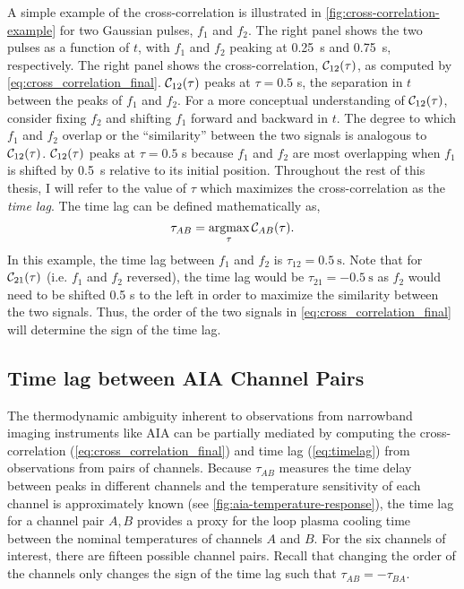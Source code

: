 A simple example of the cross-correlation is illustrated in \autoref{fig:cross-correlation-example} for two Gaussian pulses, $f_1$ and $f_2$. The right panel shows the two pulses as a function of $t$, with $f_1$ and $f_2$ peaking at \SI{0.25}{\second} and \SI{0.75}{\second}, respectively. The right panel shows the cross-correlation, $\crosscor[12]$, as computed by \autoref{eq:cross_correlation_final}. $\crosscor[12]$ peaks at $\tau=0.5$ \si{\second}, the separation in $t$ between the peaks of $f_1$ and $f_2$. For a more conceptual understanding of $\crosscor[12]$, consider fixing $f_2$ and shifting $f_1$ forward and backward in $t$. The degree to which $f_1$ and $f_2$ overlap or the ``similarity'' between the two signals is analogous to $\crosscor[12]$. $\crosscor[12]$ peaks at $\tau=0.5$ \si{\second} because $f_1$ and $f_2$ are most overlapping when $f_1$ is shifted by \SI{0.5}{\second} relative to its initial position. Throughout the rest of this thesis, I will refer to the value of $\tau$ which maximizes the cross-correlation as the \textit{time lag}. The time lag can be defined mathematically as,
\begin{equation}\label{eq:timelag}
    \tau_{AB} = \argmax_{\tau}\crosscor.
\end{equation}
In this example, the time lag between $f_1$ and $f_2$ is $\tau_{12}=\SI{0.5}{\second}$. Note that for $\crosscor[21]$ (i.e. $f_1$ and $f_2$ reversed), the time lag would be $\tau_{21}=\SI{-0.5}{\second}$ as $f_2$ would need to be shifted 0.5 s to the left in order to maximize the similarity between the two signals. Thus, the order of the two signals in \autoref{eq:cross_correlation_final} will determine the sign of the time lag.

\subsection{Time lag between AIA Channel Pairs}\label{subsec:timelag_aia}

The thermodynamic ambiguity inherent to observations from narrowband imaging instruments like AIA can be partially mediated by computing the cross-correlation (\autoref{eq:cross_correlation_final}) and time lag (\autoref{eq:timelag}) from observations from pairs of channels. Because $\tau_{AB}$ measures the time delay between peaks in different channels and the temperature sensitivity of each channel is approximately known (see \autoref{fig:aia-temperature-response}), the time lag for a channel pair $A,B$ provides a proxy for the loop plasma cooling time between the nominal temperatures of channels $A$ and $B$. For the six channels of interest, there are fifteen possible channel pairs. Recall that changing the order of the channels only changes the sign of the time lag such that $\tau_{AB}=-\tau_{BA}$.


